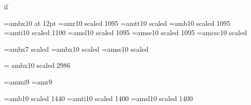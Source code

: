 {\begin{\parsearg\beginxxx}
\def\flagtrue{true}
\def\flagfalse{false}

\def\setflag{\parsearg\setflagxxx}
\def\setflagxxx #1{\expandafter\let\csname F#1\endcsname=\flagtrue}

\def\clearflag{\parsearg\clearflagxxx}
\def\clearflagxxx #1{\expandafter\let\csname F#1\endcsname=\flagfalse}

\def\defaultsetflag{\parsearg\defaultsetflagxxx}
\def\defaultsetflagxxx #1{%
\expandafter\ifx\csname F#1\endcsname\relax
\expandafter\let\csname F#1\endcsname=\flagtrue
\fi}

\def\ifset{\parsearg\ifsetxxx}

\def\ifsetxxx #1{%
\expandafter\ifx\csname F#1\endcsname\flagtrue \let\next=\relax \else
\let\next=\iffails \fi \next}

\def\ifnotset{\parsearg\ifnotsetxxx}
\def\ifclear{\parsearg\ifnotsetxxx}

\def\ifnotsetxxx #1{%
\expandafter\ifx\csname F#1\endcsname\flagtrue \let\next=\iffails \else
\let\next=\relax \fi \next}

\def\iffails #1\end if{}
\def\Eif{}

\font\btwelve=ambx10 at 12pt
\font\tenrm=amr10 scaled 1095
\font\tentt=amtt10 scaled \magstephalf
\font\tenbf=amb10 scaled 1095
\font\tenit=amti10 scaled 1100
\font\tensl=amsl10 scaled 1095
\font\tensf=amss10 scaled 1095
\def\li{\sf}
\font\tensc=amcsc10 scaled \magstephalf

\font{}=ambx7 scaled 
\let\deftt=\tentt
\font\twelvebf=ambx10 scaled  %
\font\twelvesf=amss10 scaled  %

\font\titlerm = ambx10 scaled 2986

\font\indit=ammi9 \font\indrm=amr9
\def\indbf{\indrm} \def\indsl{\indit}
\def\indexfonts{\let\it=\indit \let\sl=\indsl \let\bf=\indbf \let\rm=\indrm}

\font\secrm=amb10 scaled 1440
\font\secit=amti10 scaled 1400
\font\secsl=amsl10 scaled 1400
\let\secbf=\secrm


\end{\parsearg\beginxxx}}

